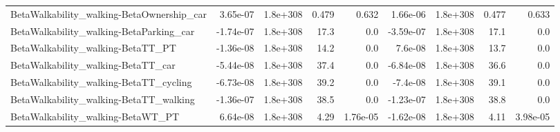 \begin{tabular}{lrrrrrrrr}
BetaWalkability_walking-BetaOwnership_car & 3.65e-07 & 1.8e+308 & 0.479 & 0.632 & 1.66e-06 & 1.8e+308 & 0.477 & 0.633 \\
BetaWalkability_walking-BetaParking_car & -1.74e-07 & 1.8e+308 & 17.3 & 0.0 & -3.59e-07 & 1.8e+308 & 17.1 & 0.0 \\
BetaWalkability_walking-BetaTT_PT & -1.36e-08 & 1.8e+308 & 14.2 & 0.0 & 7.6e-08 & 1.8e+308 & 13.7 & 0.0 \\
BetaWalkability_walking-BetaTT_car & -5.44e-08 & 1.8e+308 & 37.4 & 0.0 & -6.84e-08 & 1.8e+308 & 36.6 & 0.0 \\
BetaWalkability_walking-BetaTT_cycling & -6.73e-08 & 1.8e+308 & 39.2 & 0.0 & -7.4e-08 & 1.8e+308 & 39.1 & 0.0 \\
BetaWalkability_walking-BetaTT_walking & -1.36e-07 & 1.8e+308 & 38.5 & 0.0 & -1.23e-07 & 1.8e+308 & 38.8 & 0.0 \\
BetaWalkability_walking-BetaWT_PT & 6.64e-08 & 1.8e+308 & 4.29 & 1.76e-05 & -1.62e-08 & 1.8e+308 & 4.11 & 3.98e-05 \\
\end{tabular}
